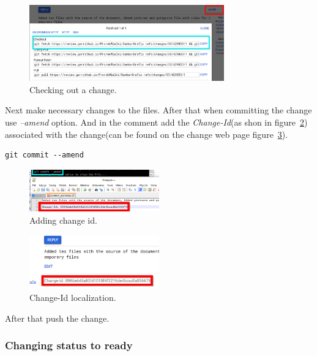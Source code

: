 \documentclass{article}
\begin{document}
\begin{figure}[!ht]
  \centering
  \includegraphics[width=0.75\textwidth]{img/Checkout}
  \caption{Checking out a change.}
  \label{fig:Checkout}
\end{figure}

Next make necessary changes to the files. After that when committing the change use \textit{--amend} option. And in the comment add the \textit{Change-Id}(as shon in figure~\ref{fig:comment}) associated with the change(can be found on the change web page figure~\ref{fig:changeId}). 

\begin{lstlisting}
git commit --amend
\end{lstlisting}

\begin{figure}[!ht]
  \centering
  \includegraphics[width=0.5\textwidth]{img/comment}
  \caption{Adding change id.}
  \label{fig:comment}
\end{figure}

\begin{figure}[!ht]
  \centering
  \includegraphics[width=0.5\textwidth]{img/changeID}
  \caption{Change-Id localization.}
  \label{fig:changeId}
\end{figure}

\newpage

After that push the change.


\subsubsection{Changing status to ready}
\end{document}
